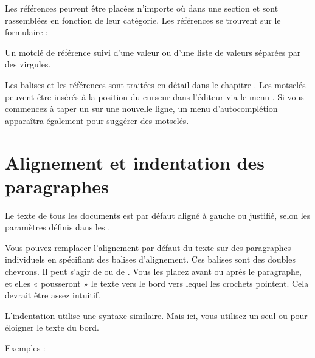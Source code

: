 \documentclass[a4paper,11pt,french]{sphinxmanual}
\begin{document}
\sphinxAtStartPar
Les références peuvent être placées n’importe où dans une section et sont rassemblées en fonction de leur catégorie. Les références se trouvent sur le formulaire :
\begin{description}
\sphinxAtStartPar
Un mot\sphinxhyphen{}clé de référence suivi d’une valeur ou d’une liste de valeurs séparées par des virgules.

\end{description}

\sphinxAtStartPar
Les balises et les références sont traitées en détail dans le chapitre {\hyperref[\detokenize{project_references:a-references}]{}}. Les mots\sphinxhyphen{}clés peuvent être insérés à la position du curseur dans l’éditeur via le menu . Si vous commencez à taper un  sur une nouvelle ligne, un menu d’auto\sphinxhyphen{}complétion apparaîtra également pour suggérer des mots\sphinxhyphen{}clés.


\section{Alignement et indentation des paragraphes}
\label{\detokenize{usage_format:paragraph-alignment-and-indentation}}\label{\detokenize{usage_format:a-fmt-align}}
\sphinxAtStartPar
Le texte de tous les documents est par défaut aligné à gauche ou justifié, selon les paramètres définis dans les .

\sphinxAtStartPar
Vous pouvez remplacer l’alignement par défaut du texte sur des paragraphes individuels en spécifiant des balises d’alignement. Ces balises sont des doubles chevrons. Il peut s’agir de \sphinxcode{\sphinxupquote{\textgreater{}\textgreater{}}} ou de \sphinxcode{\sphinxupquote{\textless{}\textless{}}}. Vous les placez avant ou après le paragraphe, et elles « pousseront » le texte vers le bord vers lequel les crochets pointent. Cela devrait être assez intuitif.

\sphinxAtStartPar
L’indentation utilise une syntaxe similaire. Mais ici, vous utilisez un seul \sphinxcode{\sphinxupquote{\textgreater{}}} ou \sphinxcode{\sphinxupquote{\textless{}}} pour éloigner le texte du bord.

\sphinxAtStartPar
Exemples :
\end{document}
